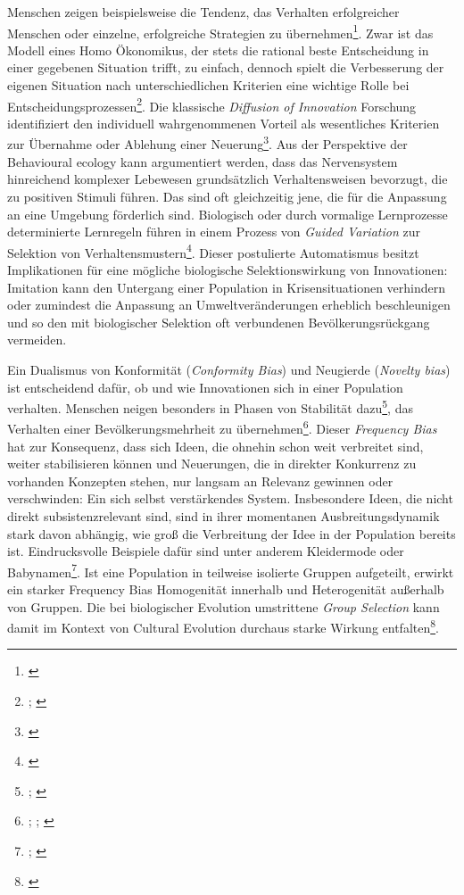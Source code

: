 \documentclass[openany,twoside,twocolumn]{book}
\let\rmarkdownfootnote\footnote%
\def\footnote{\protect\rmarkdownfootnote}
\begin{document}
Menschen zeigen beispielsweise die Tendenz, das Verhalten erfolgreicher
Menschen oder einzelne, erfolgreiche Strategien zu übernehmen\footnote{\textcite{henrich_evolution_2003}}.
Zwar ist das Modell eines Homo Ökonomikus, der stets die rational beste
Entscheidung in einer gegebenen Situation trifft, zu einfach, dennoch
spielt die Verbesserung der eigenen Situation nach unterschiedlichen
Kriterien eine wichtige Rolle bei Entscheidungsprozessen\footnote{\textcite{mesoudi_cultural_2008};
  \textcite{mesoudi_experimental_2011}}. Die klassische \emph{Diffusion
of Innovation} Forschung identifiziert den individuell wahrgenommenen
Vorteil als wesentliches Kriterien zur Übernahme oder Ablehung einer
Neuerung\footnote{\textcite{rogers_diffusion_1983}}. Aus der Perspektive
der Behavioural ecology kann argumentiert werden, dass das Nervensystem
hinreichend komplexer Lebewesen grundsätzlich Verhaltensweisen
bevorzugt, die zu positiven Stimuli führen. Das sind oft gleichzeitig
jene, die für die Anpassung an eine Umgebung förderlich sind. Biologisch
oder durch vormalige Lernprozesse determinierte Lernregeln führen in
einem Prozess von \emph{Guided Variation} zur Selektion von
Verhaltensmustern\footnote{\textcite{smith_cultural_1992}}. Dieser
postulierte Automatismus besitzt Implikationen für eine mögliche
biologische Selektionswirkung von Innovationen: Imitation kann den
Untergang einer Population in Krisensituationen verhindern oder
zumindest die Anpassung an Umweltveränderungen erheblich beschleunigen
und so den mit biologischer Selektion oft verbundenen
Bevölkerungsrückgang vermeiden.

Ein Dualismus von Konformität (\emph{Conformity Bias}) und Neugierde
(\emph{Novelty bias}) ist entscheidend dafür, ob und wie Innovationen
sich in einer Population verhalten. Menschen neigen besonders in Phasen
von Stabilität dazu\footnote{\textcite{henrich_evolution_1998};
  \textcite{kendal_evolution_2009}}, das Verhalten einer
Bevölkerungsmehrheit zu übernehmen\footnote{\textcite{efferson_conformists_2008};
  \textcite{giraldeau_social_1994}; \textcite{henrich_evolution_1998}}.
Dieser \emph{Frequency Bias} hat zur Konsequenz, dass sich Ideen, die
ohnehin schon weit verbreitet sind, weiter stabilisieren können und
Neuerungen, die in direkter Konkurrenz zu vorhanden Konzepten stehen,
nur langsam an Relevanz gewinnen oder verschwinden: Ein sich selbst
verstärkendes System. Insbesondere Ideen, die nicht direkt
subsistenzrelevant sind, sind in ihrer momentanen Ausbreitungsdynamik
stark davon abhängig, wie groß die Verbreitung der Idee in der
Population bereits ist. Eindrucksvolle Beispiele dafür sind unter
anderem Kleidermode oder Babynamen\footnote{\textcite{acerbi_biases_2014};
  \textcite{acerbi_logic_2012}}. Ist eine Population in teilweise
isolierte Gruppen aufgeteilt, erwirkt ein starker Frequency Bias
Homogenität innerhalb und Heterogenität außerhalb von Gruppen. Die bei
biologischer Evolution umstrittene \emph{Group Selection} kann damit im
Kontext von Cultural Evolution durchaus starke Wirkung
entfalten\footnote{\textcite{smith_cultural_1992}}.
\end{document}
